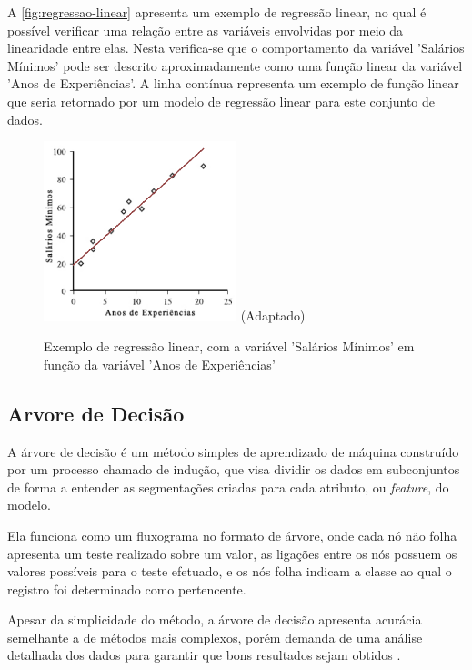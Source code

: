 A \autoref{fig:regressao-linear} apresenta um exemplo de regressão linear, no qual é possível verificar uma relação entre as variáveis envolvidas por meio da linearidade entre elas.
Nesta verifica-se que o comportamento da variável 'Salários Mínimos' pode ser descrito aproximadamente como uma função linear da variável 'Anos de Experiências'. A linha contínua representa um exemplo de função linear que seria retornado por um modelo de regressão linear para este conjunto de dados.
    
\begin{figure}[!htb]
    \centering
    \caption{Exemplo de regressão linear, com a variável 'Salários Mínimos' em função da variável 'Anos de Experiências'}
    \includegraphics[width=0.5\textwidth]{./dados/figuras/proposta/regressao-linear2}
        \label{fig:regressao-linear}(Adaptado)
    \end{figure}

\subsection{Arvore de Decisão}

A árvore de decisão é um método simples de aprendizado de máquina construído por um processo chamado de indução, que visa dividir os dados em subconjuntos de forma a entender as segmentações criadas para cada atributo, ou \textit{feature}, do modelo. 

Ela funciona como um fluxograma no formato de árvore, onde cada nó não folha apresenta um teste realizado sobre um valor, as ligações entre os nós possuem os valores possíveis para o teste efetuado, e os nós folha indicam a classe ao qual o registro foi determinado como pertencente.

Apesar da simplicidade do método, a árvore de decisão apresenta acurácia semelhante a de métodos mais complexos, porém demanda de uma análise detalhada dos dados para garantir que bons resultados sejam obtidos  \cite{Camilo2009}.

